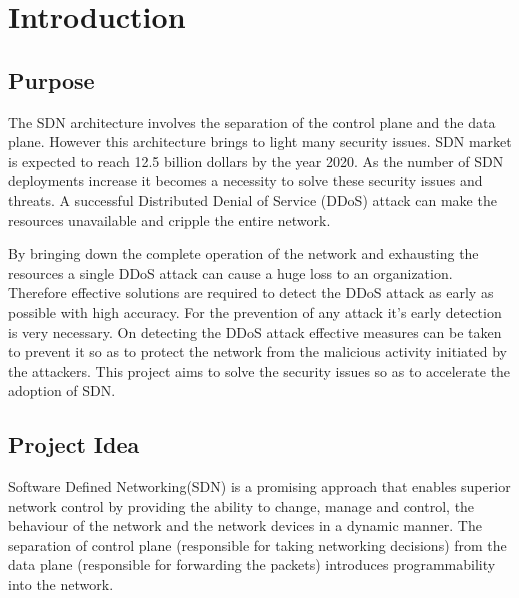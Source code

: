 \documentclass[12pt,a4paper,final]{report}
\begin{document}
\newpage

\chapter{Introduction}
\thispagestyle{empty}
\newpage
\section{Purpose}
The SDN architecture involves the separation of the control plane and the data plane. However this architecture brings to light many security issues. SDN market is expected to reach 12.5 billion dollars by the year 2020. As the number of SDN deployments increase it becomes a necessity to solve these security issues and threats. A successful Distributed Denial of Service (DDoS) attack can make the resources unavailable and cripple the entire network. 

By bringing down the complete operation of the network and exhausting the resources a single DDoS attack can cause a huge loss to an organization.  Therefore effective solutions are required to detect the DDoS attack as early as possible with high accuracy. For the prevention of any attack it's early detection is very necessary. On detecting the DDoS attack effective measures can be taken to prevent it so as to protect the network from the malicious activity initiated by the attackers. This project aims to solve the security issues so as to accelerate the adoption of SDN. 

\section{Project Idea}
Software Defined Networking(SDN) is a promising approach that enables superior network control by providing the ability to change, manage and control, the behaviour of the network and the network devices in a dynamic manner. The separation of control plane (responsible for taking networking decisions) from the data plane (responsible for forwarding the packets) introduces programmability into the network. 
\end{document}
